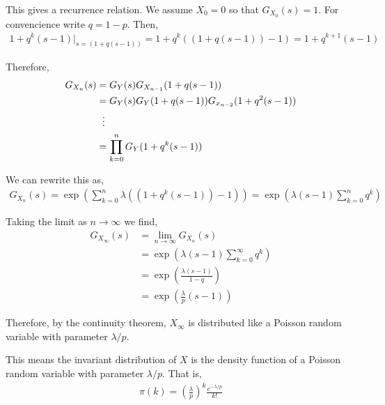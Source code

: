 \begin{solution}[Solution]
\begin{enumerate}[label=(\alph*)]
        This gives a recurrence relation. We assume \( X_0 = 0 \) so that \( G_{X_0}(s) = 1 \).
        For convencience write \( q = 1-p \). Then,
        \begin{align*}
            1+q^k(s-1) |_{s=(1+q(s-1))} = 1+q^k((1+q(s-1))-1) = 1+q^{k+1}(s-1)
        \end{align*}
        
        Therefore,
        \begin{align*}
            G_{X_n}(s) &= G_Y(s) G_{X_{n-1}}(1+q(s-1)) \\
            &= G_Y(s) G_Y(1+q(s-1)) G_{x_{n-2}}(1+q^2(s-1)) \\
            &\hspace{.6em}\vdots \\
            &= \prod_{k=0}^n G_Y(1+q^k(s-1))
        \end{align*}
       
        We can rewrite this as,
        \begin{align*}
            G_{X_n}(s) = \exp \left( \sum_{k=0}^n \lambda((1+q^k(s-1))-1) \right)
            = \exp \left( \lambda(s-1) \sum_{k=0}^n q^k \right)
        \end{align*}
        
        Taking the limit as \( n\to\infty \) we find,
        \begin{align*}
            G_{X_{\infty}}(s) 
            &= \lim_{n\to\infty} G_{X_n}(s) 
            \\&= \exp \left( \lambda(s-1) \sum_{k=0}^{\infty} q^k \right) 
            \\&= \exp \left( \frac{\lambda(s-1)}{1-q}  \right) 
            \\&= \exp\left( \frac{\lambda}{p}(s-1)\right)        
        \end{align*}
        
        Therefore, by the continuity theorem, \( X_\infty \) is distributed like a Poisson random variable with parameter \( \lambda/p \). 

        This means the invariant distribution of \( X \) is the density function of a Poisson random variable with parameter \( \lambda/p \). That is,
        \begin{align*}
            \pi(k) = \left( \frac{\lambda}{p} \right)^k \frac{e^{-\lambda/p}}{k!}
        \end{align*}
        
\end{enumerate}
\end{solution}


